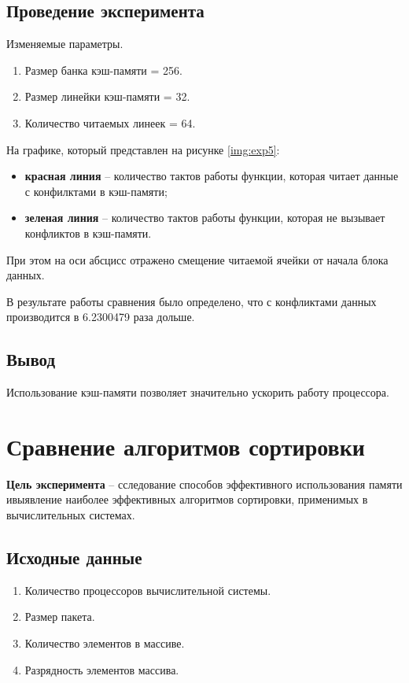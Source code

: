 \subsection{Проведение эксперимента}

Изменяемые параметры.

\begin{enumerate}
	\item Размер банка кэш-памяти = 256.
	\item Размер линейки кэш-памяти = 32.
	\item Количество читаемых линеек = 64.
\end{enumerate}

На графике, который представлен на рисунке \ref{img:exp5}:
\begin{itemize}
	\item \textbf{красная линия} -- количество тактов работы функции, которая читает данные с конфилктами в кэш-памяти;
	\item \textbf{зеленая линия} -- количество тактов работы функции, которая не вызывает конфликтов в кэш-памяти.
\end{itemize}

При этом на оси абсцисс отражено смещение читаемой ячейки от начала блока данных.



\clearpage


В результате работы сравнения было определено, что с конфликтами данных производится в 6.2300479 раза дольше.



\subsection{Вывод}

Использование кэш-памяти позволяет значительно ускорить работу процессора.




\section{Сравнение алгоритмов сортировки}

\textbf{Цель эксперимента} -- сследование способов эффективного использования  памяти ивыявление наиболее эффективных алгоритмов сортировки, применимых в вычислительных системах.

\subsection{Исходные данные}
\begin{enumerate}
	\item Количество процессоров вычислительной системы.
	\item Размер пакета.
	\item Количество элементов в массиве.
	\item Разрядность элементов массива.
\end{enumerate}

